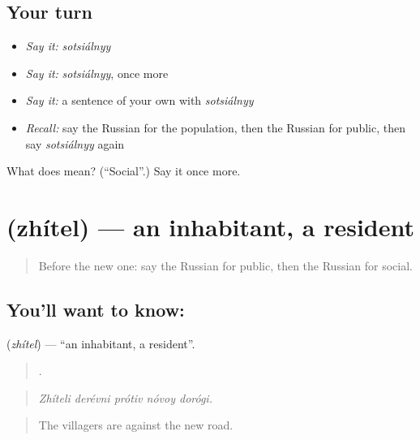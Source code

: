 \subsection*{Your turn}
\begin{itemize}
\raggedright
  \item \emph{Say it:} \emph{sotsiálnyy}
  \item \emph{Say it:} \emph{sotsiálnyy}, once more
  \item \emph{Say it:} a sentence of your own with \emph{sotsiálnyy}
  \item \emph{Recall:} say the Russian for the population, then the Russian for public, then say \emph{sotsiálnyy} again
\end{itemize}

\begin{tcolorbox}[breakable,colback=teal!4,colframe=teal!35!black,title={Before you move on}]
What does  mean? (\textquotedblleft{}Social\textquotedblright{}.) Say it once more.
\end{tcolorbox}
\section[\texorpdfstring{\ru{житель} (zhítel)}{житель (zhítel)}]{ (zhítel) — an inhabitant, a resident}

\label{lesson:RU-C364-zhitel}



\begin{quote}
Before the new one: say the Russian for public, then the Russian for social.
\end{quote}

\subsection*{You'll want to know: }
\textbf{} (\emph{zhítel}) — \textquotedblleft{}an inhabitant, a resident\textquotedblright{}.

\begin{quote}
    .
\end{quote}

\begin{quote}
\emph{Zhíteli derévni prótiv nóvoy dorógi.}
\end{quote}

\begin{quote}
The villagers are against the new road.
\end{quote}

